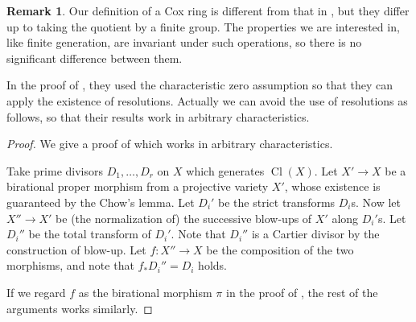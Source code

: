 \documentclass[12pt,twoside]{amsart}
\theoremstyle{definition}
\newtheorem{rem}[theo]{Remark}
\newcommand\Cl{\mathop{\mathrm{Cl}}\nolimits}
\begin{document}
\begin{rem}
Our definition of a Cox ring is different from that in \cite[\S 2]{ahl}, but they differ up to taking the quotient
by a finite group. The properties we are interested in, like finite generation, are invariant under such operations,
so there is no significant difference between them.

In the proof of \cite[Lemma 2.4]{ahl}, they used 
the characteristic zero assumption so that they can apply the existence of resolutions.
Actually we can avoid the use of resolutions as follows, so that their results work in arbitrary characteristics.

\begin{proof}
We give a proof of \cite[Lemma 2.4]{ahl} which works in arbitrary characteristics.

Take prime divisors $D_1,\dots,D_r$ on $X$ which generates $\Cl{(X)}$.
Let $X'\to X$ be a birational proper morphism from a projective variety $X'$, whose existence is
guaranteed by the Chow's lemma.
Let $D_i'$ be the strict transforms $D_i$s.
Now let $X''\to X'$ be (the normalization of) the successive blow-ups of $X'$ along $D_i'$s.
Let $D_i''$ be the total transform of $D_i'$. Note that $D_i''$ is a Cartier divisor by the construction
of blow-up.
Let $f:X''\to X$ be the composition of the two morphisms, and note that $f_{*}D_i''=D_i$ holds.

If we regard $f$ as the birational morphism $\pi$ in the proof of \cite[Lemma 2.4]{ahl}, the rest of the arguments works similarly.
\end{proof}

\end{rem}
\end{document}
